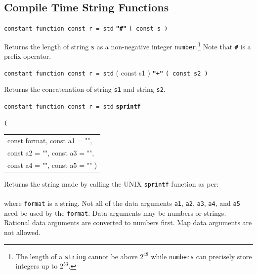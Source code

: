 \documentclass[12pt]{article}
\newcommand{\ttkey}[1]{{\tt \bfseries #1}}
\newenvironment{indpar}[1][0.3in]%
	{\begin{list}{}%
		     {\setlength{\itemsep}{0in}%
		      \setlength{\topsep}{0in}%
		      \setlength{\parsep}{1ex}%
		      \setlength{\labelwidth}{#1}%
		      \setlength{\leftmargin}{#1}%
		      \addtolength{\leftmargin}{\labelsep}}%
	 \item}%
	{\end{list}}
\begin{document}
\subsection{Compile Time String Functions}

{\tt constant function const r = std} \ttkey{"\#"} {\tt ( const s )}
\begin{indpar}
Returns the length of string {\tt s} as a non-negative integer
{\tt number}.\footnote{The length of a {\tt string} cannot
be above $2^{48}$ while
{\tt numbers} can precisely store integers up to $2^{53}$.}
Note that {\tt \#} is a prefix operator.
\end{indpar}

{\tt constant function const r = std}
    ( const s1 ) \ttkey{"+"} {\tt ( const s2 )}
\begin{indpar}
Returns the concatenation of string {\tt s1}
and string {\tt s2}.
\end{indpar}

{\tt constant function const r = std} \ttkey{sprintf}\label{SPRINTF}
    {\tt ( \begin{tabular}[t]{@{}l}
            const format, const a1 = "", \\
	    const a2 = "", const a3 = "", \\
	    const a4 = "", const a5 = "" )
	    \end{tabular} }
\begin{indpar}
Returns the string made by calling the UNIX {\tt sprintf} function as per: \\
\hspace*{1in}{\tt sprintf ( format, a1, a2, a3, a4, a5 )} \\
where {\tt format} is a string.  Not all of the data arguments
{\tt a1}, {\tt a2}, {\tt a3}, {\tt a4}, and {\tt a5}
need be used by the {\tt format}.
Data arguments may be numbers or strings.
Rational data arguments are converted to numbers first.  Map data arguments
are not allowed.
\end{indpar}
\end{document}
